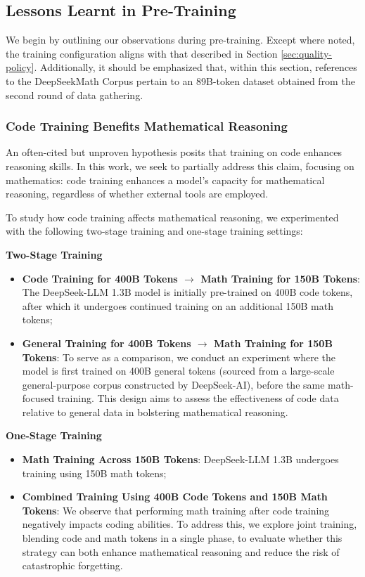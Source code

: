 \begin{itemize}[topsep=0pt]
\begin{itemize}[topsep=0pt]
\subsection{Lessons Learnt in Pre-Training}

We begin by outlining our observations during pre-training. Except where noted, the training configuration aligns with that described in Section \ref{sec:quality-policy}. Additionally, it should be emphasized that, within this section, references to the DeepSeekMath Corpus pertain to an 89B-token dataset obtained from the second round of data gathering.

\subsubsection{Code Training Benefits Mathematical Reasoning}

An often-cited but unproven hypothesis posits that training on code enhances reasoning skills. In this work, we seek to partially address this claim, focusing on mathematics: code training enhances a model’s capacity for mathematical reasoning, regardless of whether external tools are employed.

To study how code training affects mathematical reasoning, we experimented with the following two-stage training and one-stage training settings:

\textbf{Two-Stage Training}

\begin{itemize}[topsep=0pt]
    \item \textbf{Code Training for 400B Tokens $\rightarrow$ Math Training for 150B Tokens}: The DeepSeek-LLM 1.3B model is initially pre-trained on 400B code tokens, after which it undergoes continued training on an additional 150B math tokens;
    \item \textbf{General Training for 400B Tokens $\rightarrow$ Math Training for 150B Tokens}: To serve as a comparison, we conduct an experiment where the model is first trained on 400B general tokens (sourced from a large-scale general-purpose corpus constructed by DeepSeek-AI), before the same math-focused training. This design aims to assess the effectiveness of code data relative to general data in bolstering mathematical reasoning.
\end{itemize}

\textbf{One-Stage Training}

\begin{itemize}[topsep=0pt]
    \item \textbf{Math Training Across 150B Tokens}: DeepSeek-LLM 1.3B undergoes training using 150B math tokens;
    \item \textbf{Combined Training Using 400B Code Tokens and 150B Math Tokens}: We observe that performing math training after code training negatively impacts coding abilities. To address this, we explore joint training, blending code and math tokens in a single phase, to evaluate whether this strategy can both enhance mathematical reasoning and reduce the risk of catastrophic forgetting.
\end{itemize}


\end{itemize}
\end{itemize}
